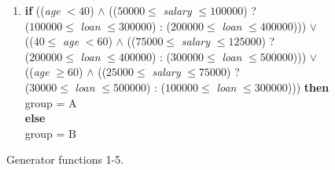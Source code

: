 \begin{figure}
\begin{enumerate}
\hspace*{2em} ($50000 \le$ {\it salary} $\le 100000$) : ($75000 \le$ {\it salary} $\le 125000$))) $\lor$\\
\hspace*{1em} (({\it age} $\ge 60$) $\land$ ({\it elevel} $\in [2..4]$ ?\\
\hspace*{2em} ($50000 \le$ {\it salary} $\le 100000$) : ($25000 \le$ {\it salary} $\le 75000$))) {\bf then}\\
\hspace*{1em} {\it group} = A\\
{\bf else}\\
\hspace*{1em} {\it group} = B\\
\item
{\bf if} (({\it age} $< 40$) $\land$ (($50000 \le$ {\it salary} $\le 100000$) ?\\
\hspace*{2em} ($100000 \le$ {\it loan} $\le 300000$) : ($200000 \le$ {\it loan} $\le 400000$))) $\lor$\\
\hspace*{1em} (($40 \le$ {\it age} $< 60$) $\land$ (($75000 \le$ {\it salary} $\le 125000$) ?\\
\hspace*{2em} ($200000 \le$ {\it loan} $\le 400000$) : ($300000 \le$ {\it loan} $\le 500000$))) $\lor$\\
\hspace*{1em} (({\it age} $\ge 60$) $\land$ (($25000 \le$ {\it salary} $\le 75000$) ?\\
\hspace*{2em} ($30000 \le$ {\it loan} $\le 500000$) : ($100000 \le$ {\it loan} $\le 300000$))) {\bf then}\\
\hspace*{1em} group = A\\
{\bf else}\\
\hspace*{1em} group = B\\
\end{enumerate}
\caption{Generator functions 1-5.}
\label{fig:agrawalFuncs1}
\end{figure}

